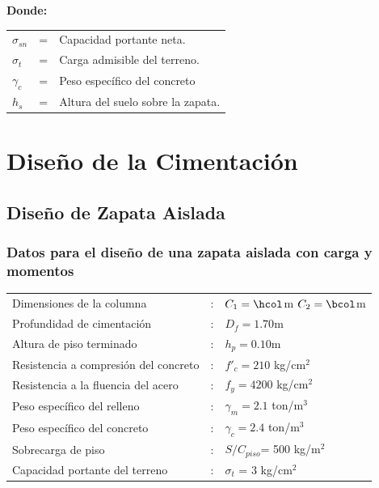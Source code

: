 \documentclass{article}%
\begin{document}
    \textbf{Donde:}

    \begin{table}[h!]
        \centering
        \begin{tabular}{lll}
            $\sigma_{sn}$ &=&    Capacidad portante neta.\\
            $\sigma_t$ &=&   Carga admisible del terreno.\\
            $\gamma_c$ &=&    Peso específico del concreto\\
            $h_s$ &=&   Altura del suelo sobre la zapata.\\
        \end{tabular}
    \end{table}
\section{Diseño de la Cimentación}%
\label{sec:DiseodelaCimentacin}%
\subsection{Diseño de Zapata Aislada}%
\label{subsec:DiseodeZapataAislada}%
\FPset{}
\FPset{}
%
\subsubsection{Datos para el diseño de una zapata aislada con carga y momentos}

\begin{table}[h!]
    \centering

    \begin{tabular}{lcl} %
        Dimensiones de la columna               &:& $C_1        = \hcol$m \quad $C_2 = \bcol$m\\
        Profundidad de cimentación              &:& $D_f        = 1.70 $m\\
        Altura de piso terminado                &:& $h_p        = 0.10$m\\
        Resistencia a compresión del concreto   &:& $f'_c       = 210$ kg/cm$^2$ \\
        Resistencia a la fluencia del acero     &:& $f_y        = 4200$ kg/cm$^2$ \\
        Peso específico del relleno             &:& $\gamma_m   = 2.1$ ton/m$^3$ \\
        Peso específico del concreto            &:& $\gamma_c   = 2.4$ ton/m$^3$ \\
        Sobrecarga de piso                      &:& $S/C_{piso}$= 500 kg/m$^2$ \\ 
        Capacidad portante del terreno          &:& $\sigma_t$  = 3 kg/cm$^2$  \\ %
        
    \end{tabular}
\end{table}
\end{document}
